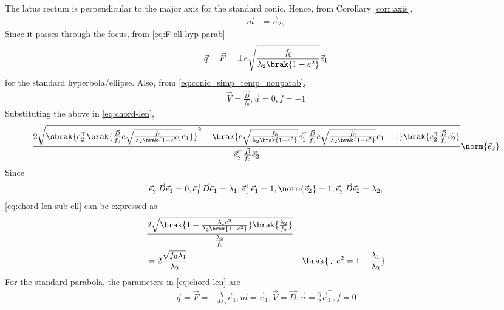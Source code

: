 		\section{}
		\label{app:latus}
			The latus rectum is perpendicular to the major axis for the standard conic.  Hence, from Corollary  
		\eqref{corr:axis},
  \begin{align}
  \vec{m}&= \vec{e}_2,  
\end{align}  
Since it passes through the focus, from 
					\eqref{eq:F-ell-hyp-parab}
  \begin{align}
	  \vec{q} =			\vec{F} 
=
					 \pm e\sqrt{\frac{f_0}{\lambda_2\brak{1-e^2}}} \vec{e }_1
\end{align}  
for the standard hyperbola/ellipse.  Also, 
from 
    \eqref{eq:conic_simp_temp_nonparab},
  \begin{align}
	  \vec{V} =     \frac{\vec{D} }{f_0}, 
	   \vec{u} = 0, 
	   f = -1
	    \label{eq:latus_rectum_ellipse_param-new}
\end{align}  
Substituting the above in
\eqref{eq:chord-len}, 
\begin{align}
 \frac{2\sqrt{
\sbrak{
\vec{e}_2^{\top}\brak{\frac{\vec{D}}{f_0} e\sqrt{\frac{f_0}{\lambda_2\brak{1-e^2}}} \vec{e }_1}
}^2
-
\brak
{
 e\sqrt{\frac{f_0}{\lambda_2\brak{1-e^2}}} \vec{e }_1^{\top}\frac{\vec{D}}{f_0} e\sqrt{\frac{f_0}{\lambda_2\brak{1-e^2}}} \vec{e }_1 -1 
}
\brak{\vec{e}_2^{\top}\frac{\vec{D}}{f_0}\vec{e}_2}
}
}
{
\vec{e}_2^{\top}\frac{\vec{D}}{f_0}\vec{e}_2
}\norm{\vec{e}_2}
\label{eq:chord-len-sub-ell}
  \end{align}
  Since 
  \begin{align}
\vec{e}_2^{\top}\vec{D}\vec{e}_1 = 0, 
\vec{e}_1^{\top}\vec{D}\vec{e}_1 = \lambda_1,
\vec{e}_1^{\top}\vec{e}_1 = 1,
	  \norm{\vec{e}_2} = 1,
\vec{e}_2^{\top}\vec{D}\vec{e}_2 = \lambda_2,
  \end{align}
\eqref{eq:chord-len-sub-ell} can be expressed as 
  \begin{align}
	&		\frac{2\sqrt{\brak{1-\frac{\lambda_1e^2}{{\lambda_2\brak{1-e^2}}}}\brak{\frac{\lambda_2}{f_0}}}}
{
	\frac{\lambda_2}{f_0}
	} 	
	\\
	&=		2\frac{\sqrt{
		f_0\lambda_1}}{\lambda_2}
 & \brak{ \because e^2 = 1-\frac{\lambda_1}{\lambda_2}}
		   \end{align}
For the standard parabola, the parameters in 
\eqref{eq:chord-len} are
\begin{align}  
	\vec{q} =\vec{F} =  -\frac{\eta}{4\lambda_2}\vec{e}_1, \vec{m} = \vec{e}_1, \vec{V} = \vec{D},
	\vec{u} = \frac{\eta}{2}\vec{e}_1^{\top}, f = 0
\end{align}  

